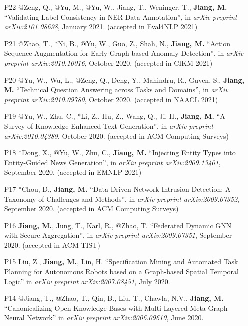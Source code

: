 \documentclass[10pt]{article}
\newenvironment{myindentpar}[1]%
{\begin{list}{}%
         {\setlength{\leftmargin}{#1}}%
         \item[]%
}
{\end{list}}
\newcounter{list}
\begin{document}
\begin{myindentpar}{0.00cm}
{\begin{enumerate}[leftmargin=.5cm]
\item[P22] @Zeng, Q., @Yu, M., @Yu, W., Jiang, T., Weninger, T., \textbf{Jiang, M.} ``Validating Label Consistency in NER Data Annotation'', in \textit{arXiv preprint arXiv:2101.08698}, January 2021. (accepted in Eval4NLP 2021)

\item[P21] @Zhao, T., *Ni, B., @Yu, W., Guo, Z., Shah, N., \textbf{Jiang, M.} ``Action Sequence Augmentation for Early Graph-based Anomaly Detection'', in \textit{arXiv preprint arXiv:2010.10016}, October 2020. (accepted in CIKM 2021)

\item[P20] @Yu, W., Wu, L., @Zeng, Q., Deng, Y., Mahindru, R., Guven, S., \textbf{Jiang, M.} ``Technical Question Answering across Tasks and Domains'', in \textit{arXiv preprint arXiv:2010.09780}, October 2020. (accepted in NAACL 2021)

\item[P19] @Yu, W., Zhu, C., *Li, Z., Hu, Z., Wang, Q., Ji, H., \textbf{Jiang, M.} ``A Survey of Knowledge-Enhanced Text Generation'', in \textit{arXiv preprint arXiv:2010.04389}, October 2020. (accepted in ACM Computing Surveys)
		
\item[P18] *Dong, X., @Yu, W., Zhu, C., \textbf{Jiang, M.} ``Injecting Entity Types into Entity-Guided News Generation'', in \textit{arXiv preprint arXiv:2009.13401}, September 2020. (accepted in EMNLP 2021)
		
\item[P17] *Chou, D., \textbf{Jiang, M.} ``Data-Driven Network Intrusion Detection: A Taxonomy of Challenges and Methods'', in \textit{arXiv preprint arXiv:2009.07352}, September 2020. (accepted in ACM Computing Surveys)

\item[P16] \textbf{Jiang, M.}, Jung, T., Karl, R., @Zhao, T. ``Federated Dynamic GNN with Secure Aggregation'', in \textit{arXiv preprint arXiv:2009.07351}, September 2020. (accepted in ACM TIST)

\item[P15] Liu, Z., \textbf{Jiang, M.}, Lin, H. ``Specification Mining and Automated Task Planning for Autonomous Robots based on a Graph-based Spatial Temporal Logic'' in \textit{arXiv preprint arXiv:2007.08451}, July 2020.

\item[P14] @Jiang, T., @Zhao, T., Qin, B., Liu, T., Chawla, N.V., \textbf{Jiang, M.} ``Canonicalizing Open Knowledge Bases with Multi-Layered Meta-Graph Neural Network'' in \textit{arXiv preprint arXiv:2006.09610}, June 2020.
		

\end{enumerate}}
\end{myindentpar}
\end{document}
